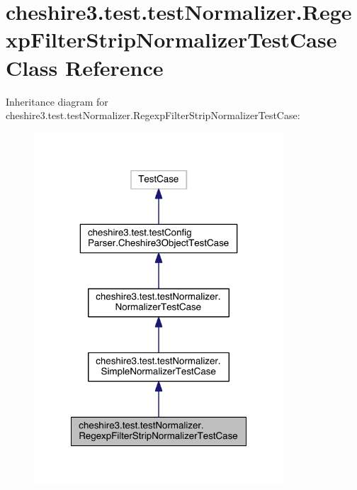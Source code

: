 \hypertarget{classcheshire3_1_1test_1_1test_normalizer_1_1_regexp_filter_strip_normalizer_test_case}{\section{cheshire3.\-test.\-test\-Normalizer.\-Regexp\-Filter\-Strip\-Normalizer\-Test\-Case Class Reference}
\label{classcheshire3_1_1test_1_1test_normalizer_1_1_regexp_filter_strip_normalizer_test_case}
}


Inheritance diagram for cheshire3.\-test.\-test\-Normalizer.\-Regexp\-Filter\-Strip\-Normalizer\-Test\-Case\-:
\nopagebreak
\begin{figure}[H]
\begin{center}
\leavevmode
\includegraphics[width=264pt]{classcheshire3_1_1test_1_1test_normalizer_1_1_regexp_filter_strip_normalizer_test_case__inherit__graph}
\end{center}
\end{figure}


